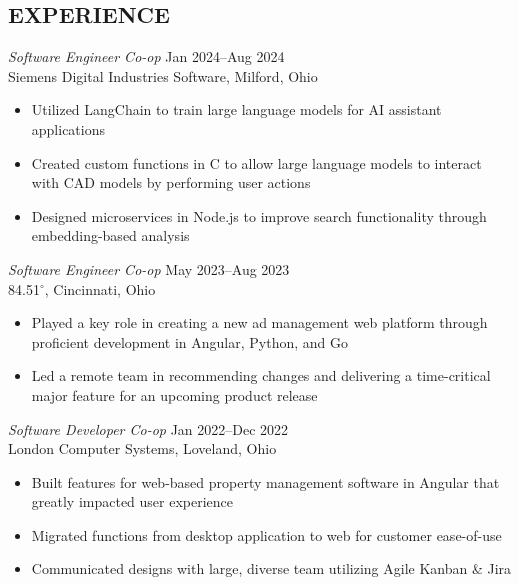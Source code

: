 \documentclass[margin]{res} %
\begin{document}
\begin{resume}
\vspace*{-7.5mm}
 
 
\section{EXPERIENCE}
{\sl Software Engineer Co-op} \hfill {\color{black} Jan 2024–Aug 2024} \\
Siemens Digital Industries Software, Milford, Ohio
\begin{itemize} \itemsep -2pt %
\item Utilized LangChain to train large language models for AI assistant applications 
\item Created custom functions in C to allow large language models to interact with CAD models by performing user actions
\item Designed microservices in Node.js to improve search functionality through\\embedding-based analysis
\end{itemize}

{\sl Software Engineer Co-op} \hfill {\color{black} May 2023–Aug 2023}  \\
84.51$^{\circ}$, Cincinnati, Ohio 
\begin{itemize} \itemsep -2pt %
\item Played a key role in creating a new ad management web platform through proficient development in Angular, Python, and Go
\item  Led a remote team in recommending changes and delivering a time-critical major feature for an upcoming product release
\end{itemize}

{\sl Software Developer Co-op} \hfill {\color{black} Jan 2022–Dec 2022}  \\
London Computer Systems, Loveland, Ohio 
\begin{itemize} \itemsep -2pt %
\item Built features for web-based property management software in Angular that greatly impacted user experience
\item Migrated functions from desktop application to web for customer ease-of-use
\item Communicated designs with large, diverse team utilizing Agile Kanban \& Jira
\end{itemize}
 

\end{resume}
\end{document}
